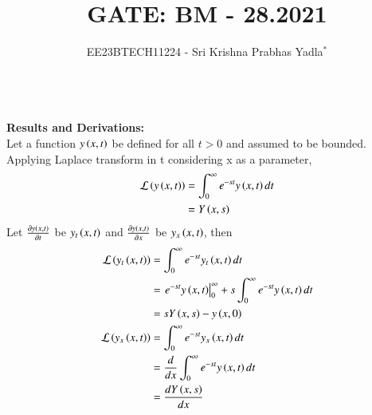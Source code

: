 \documentclass[journal,12pt,twocolumn]{IEEEtran}
\theoremstyle{remark}
\begin{document}

\vspace{3cm}

\title{GATE: BM - 28.2021}
\author{EE23BTECH11224 - Sri Krishna Prabhas Yadla$^{*}$%
}
\maketitle
\newpage
\bigskip

\renewcommand{\thefigure}{\arabic{figure}}
\renewcommand{\thetable}{\arabic{table}}


\vspace{3cm}
\\
\textbf{Results and Derivations:}
\\
Let a function $y\left(x,t\right)$ be defined for all $t>0$ and assumed to be bounded. Applying Laplace transform in t considering x as a parameter,
\begin{align}
 \mathcal{L}\left(y\left(x,t\right)\right) &= \int_{0}^{\infty}e^{-st}y\left(x,t\right)dt\\
 &= Y\left(x,s\right)
\end{align}
Let $\frac{\partial y\left(x,t\right)}{\partial t}$ be $y_t\left(x,t\right)$ and $\frac{\partial y\left(x,t\right)}{\partial x}$ be $y_x\left(x,t\right)$, then
\begin{align}
 \mathcal{L}\left(y_t\left(x,t\right)\right) &= \int_{0}^{\infty}e^{-st}y_t\left(x,t\right)dt\\
 &= \left. e^{-st}y\left(x,t\right)\right|_{0}^{\infty} + s\int_{0}^{\infty}e^{-st} y\left(x,t\right) dt\\
 &= sY\left(x,s\right) - y\left(x,0\right) \label{L(y_t(x,t))}\\
 \mathcal{L}\left(y_x\left(x,t\right)\right) &= \int_{0}^{\infty}e^{-st}y_x\left(x,t\right)dt\\
 &= \frac{d}{dx}\int_{0}^{\infty}e^{-st}y\left(x,t\right)dt \label{L(y_x(x,t))}\\
 &= \frac{dY\left(x,s\right)}{dx}
\end{align}
\end{document}
